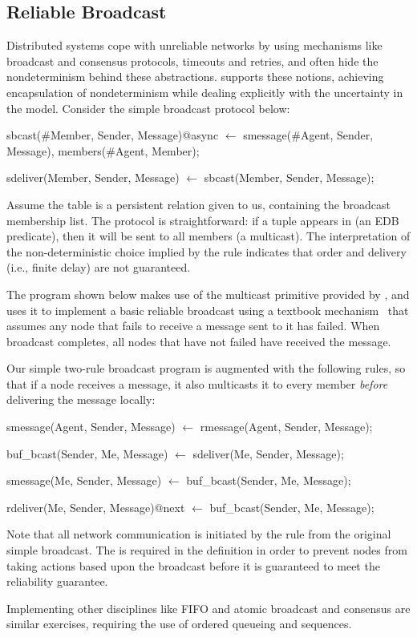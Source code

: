 \subsection{Reliable Broadcast}
Distributed systems cope with unreliable networks by using mechanisms like broadcast and consensus protocols, 
timeouts and retries, and often hide the nondeterminism behind these abstractions.  \lang supports these notions,
achieving encapsulation of nondeterminism while dealing explicitly with the uncertainty in the model.  Consider the simple
broadcast protocol below:

\begin{Dedalus}
sbcast(#Member, Sender, Message)@async \(\leftarrow\)
  smessage(#Agent, Sender, Message),
  members(#Agent, Member);

sdeliver(Member, Sender, Message) \(\leftarrow\)
  sbcast(Member, Sender, Message);
\end{Dedalus}

Assume the table  is a persistent relation given to us, containing the broadcast 
membership list.  
The protocol is straightforward: if a tuple appears in  (an EDB predicate), then
it will be sent to all members (a multicast).  The interpretation of the non-deterministic choice implied by the
 rule indicates that order and delivery (i.e., finite delay) are not guaranteed.

The program shown below makes use of the
multicast primitive provided by , and uses it
to implement a basic reliable broadcast using a textbook
mechanism~\cite{mullender} that assumes any node that fails to receive
a message sent to it has failed.  When broadcast completes, all nodes
that have not failed have received the message.

Our simple two-rule broadcast program is augmented with the following rules, so that if a node receives a message, it 
also multicasts it to every member \emph{before} delivering the message locally:

\begin{Dedalus}
smessage(Agent, Sender, Message)  \(\leftarrow\)
  rmessage(Agent, Sender, Message);

buf_bcast(Sender, Me, Message)  \(\leftarrow\)
  sdeliver(Me, Sender, Message);

smessage(Me, Sender, Message)  \(\leftarrow\)
  buf_bcast(Sender, Me, Message);

rdeliver(Me, Sender, Message)@next  \(\leftarrow\)
  buf_bcast(Sender, Me, Message);
\end{Dedalus}

Note that all network communication is initiated by the
 rule from the original simple broadcast.  The  is
required in the  definition in order to prevent nodes from
taking actions based upon the broadcast before it is guaranteed to
meet the reliability guarantee.

Implementing other disciplines like FIFO and atomic broadcast and
consensus are similar exercises, requiring the use of ordered queueing
and sequences.
